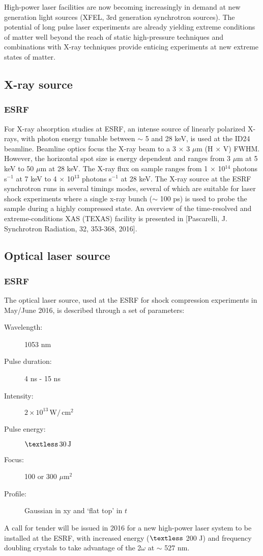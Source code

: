 \documentclass[a4paper]{article}
\begin{document}
High-power laser facilities are now becoming increasingly in demand at new generation light sources (XFEL, 3rd generation synchrotron sources). The potential of long pulse laser experiments are already yielding extreme conditions of matter well beyond the reach of static high-pressure techniques and combinations with X-ray techniques provide enticing experiments at new extreme states of matter.

\subsection{X-ray source}
\subsubsection{ESRF}
For X-ray absorption studies at ESRF, an intense source of linearly polarized X-rays, with photon energy tunable between $\sim$ 5 and 28 keV, is used at the ID24 beamline. Beamline optics focus the X-ray beam to a 3 $\times$ 3 $\mu$m (H $\times$ V) FWHM. However, the horizontal spot size is energy dependent and ranges from 3 $\mu$m at 5 keV to 50 $\mu$m at 28 keV. The X-ray flux on sample ranges from 1 $\times$ 10$^{14}$ photons s$^{-1}$ at 7 keV to 4 $\times$ 10$^{13}$ photons s$^{-1}$ at 28 keV. The X-ray source at the ESRF synchrotron runs in several timings modes, several of which are suitable for laser shock experiments where a single x-ray bunch ($\sim$ 100 ps) is used to probe the sample during a highly compressed state. An overview of the time-resolved and extreme-conditions XAS (TEXAS) facility is presented in [Pascarelli, J. Synchrotron Radiation, 32, 353-368, 2016].
\subsection{Optical laser source}
\subsubsection{ESRF}
The optical laser source, used at the ESRF for shock compression experiments in May/June 2016,  is described through a set of parameters:
\begin{description}
  \item[Wavelength:] 1053 nm
  \item[Pulse duration:] 4 ns - 15 ns
  \item[Intensity:] $2\times 10^{13}\,\text{W}/\,\text{cm}^2$
  \item[Pulse energy:] $\textless \, 30\, \text{J}$
  \item[Focus:] 100 or 300 $\mu\text{m}^{2}$
  \item[Profile:] Gaussian in xy and `flat top' in $t$
\end{description}
A call for tender will be issued in 2016 for a new high-power laser system to be installed at the ESRF, with increased energy ($\textless$ 200 J) and frequency doubling crystals to take advantage of the 2$\omega$ at $\sim$ 527 nm.
\end{document}
